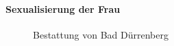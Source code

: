 \documentclass[
  letterpaper,
  DIV=11,
  numbers=noendperiod,
  landscape,
  a4paper,
  geometry:margin=1in]{scrartcl}
\let\oldparagraph\paragraph
\renewcommand{\paragraph}[1]{\oldparagraph{#1}\mbox{}}
\begin{document}
\paragraph{Sexualisierung der Frau}\label{sexualisierung-der-frau}

\begin{figure}


\caption{\label{fig-bestattung-von-bad-duerrenberg}Bestattung von Bad
Dürrenberg}

\end{figure}%
\end{document}
